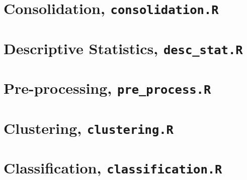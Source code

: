 \documentclass[../thesis.tex]{subfiles}
\begin{document}


\section{Consolidation, \texttt{consolidation.R}}
\label{sec:consolidation}



\section{Descriptive Statistics, \texttt{desc\_stat.R}}
\label{sec:app_desc_stat}



\section{Pre-processing, \texttt{pre\_process.R}}
\label{sec:pre_proc}



\section{Clustering, \texttt{clustering.R}}
\label{sec:clust}



\section{Classification, \texttt{classification.R}}
\label{sec:classifi}


\end{document}
